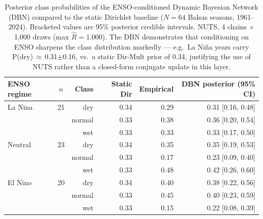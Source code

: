\begin{table}[t]
\centering
\caption{Posterior class probabilities of the ENSO-conditioned Dynamic Bayesian Network (DBN) compared to the static Dirichlet baseline ($N=64$ Balsas seasons, 1961--2024). Bracketed values are 95\% posterior credible intervals. NUTS, 4 chains $\times$ 1{,}000 draws (max $\hat{R}=1.000$). The DBN demonstrates that conditioning on ENSO sharpens the class distribution markedly --- e.g.\ La Ni\~na years carry P(dry)\,$\approx$\,0.31$\pm$0.16, vs.\ a static Dir-Mult prior of 0.34, justifying the use of NUTS rather than a closed-form conjugate update in this layer.}
\label{tab:dbn-enso}
\begin{tabular}{lcrrrr}
\toprule
ENSO regime & $n$ & Class & Static Dir & Empirical & DBN posterior (95\% CI) \\
\midrule
La Nina & 21 & dry & 0.34 & 0.29 & 0.31 [0.16, 0.48] \\
 &  & normal & 0.33 & 0.38 & 0.36 [0.20, 0.54] \\
 &  & wet & 0.33 & 0.33 & 0.33 [0.17, 0.50] \\
\addlinespace
Neutral & 23 & dry & 0.34 & 0.35 & 0.35 [0.19, 0.53] \\
 &  & normal & 0.33 & 0.17 & 0.23 [0.09, 0.40] \\
 &  & wet & 0.33 & 0.48 & 0.42 [0.26, 0.60] \\
\addlinespace
El Nino & 20 & dry & 0.34 & 0.40 & 0.38 [0.22, 0.56] \\
 &  & normal & 0.33 & 0.45 & 0.40 [0.23, 0.59] \\
 &  & wet & 0.33 & 0.15 & 0.22 [0.08, 0.39] \\
\bottomrule
\end{tabular}
\end{table}